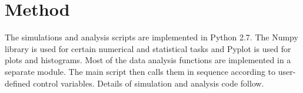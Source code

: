 \section{Method}
\label{sec:method}
The simulations and analysis scripts are implemented in Python 2.7. The Numpy library is used for certain numerical and statistical tasks and Pyplot is used for plots and histograms. Most of the data analysis functions are implemented in a separate module. The main script then calls them in sequence according to user-defined control variables. Details of simulation and analysis code follow.\\
